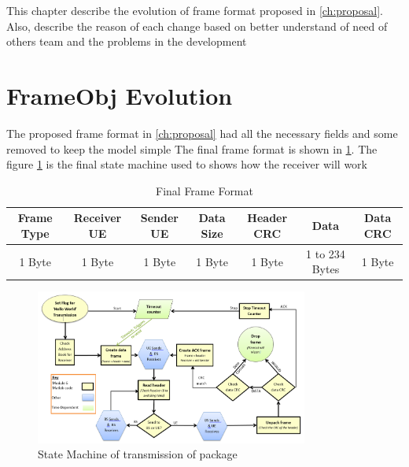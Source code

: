 This chapter describe the evolution of frame format proposed in \ref{ch:proposal}. Also, describe the reason
 of each change based on better understand of need of others team and the problems in the development


\section{FrameObj Evolution}

The proposed frame format in \ref{ch:proposal} had all the necessary fields and some removed to keep the model simple
The final frame format is  shown in \ref{tab:finalFrame}.
The figure \ref{fig:stateMachine} is the final state machine used to shows how the receiver will work

\begin{table}
\begin{tabular}{| c | c | c | c | c | c | c | }
  \hline                       
  Frame Type & Receiver UE & Sender UE & Data Size & Header CRC & Data & Data CRC\\
  \hline
	1 Byte & 1 Byte & 1 Byte & 1 Byte & 1 Byte & 1 to 234 Bytes & 1 Byte\\
  
  \hline  
\end{tabular}
 \caption{Final Frame Format}
	\label{tab:finalFrame}
\end{table}

\begin{figure}[p]
    \centering
    \includegraphics[width=0.8\textwidth]{Diagram.png}
    \caption{State Machine of transmission of package }
    \label{fig:stateMachine}
\end{figure}